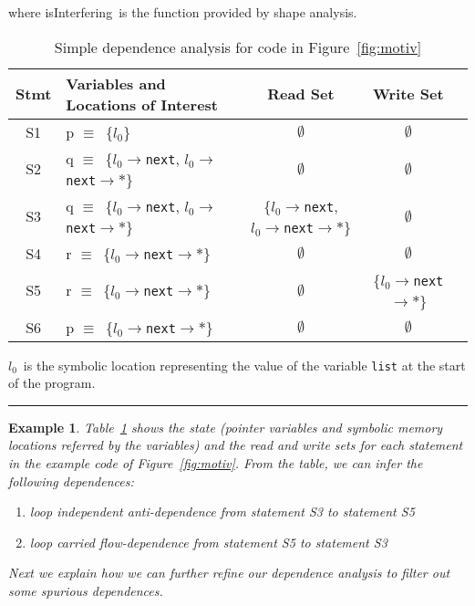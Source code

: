 \documentclass{IOS-Book-Article}
\newtheorem{example}{Example}
\newcommand{\loc}{\ensuremath{l_0}}
\newcommand{\mynext}{\mbox{\tt next}}
\newcommand{\isInterfering}{\mbox{isInterfering}}
\begin{document}
\noindent where \isInterfering\ is the function provided by
shape analysis.

\newcommand{\mapp}{$\equiv$}
\begin{table}
\centering
\begin{tabular}{|c|l|c|c|c|}
\hline 
Stmt & Variables and Locations of Interest & Read Set & Write
Set \\ 
\hline
S1 & p  \mapp\  \{$\loc$\} & $\emptyset$ & $\emptyset$ \\
S2 & q \mapp\   \{$\loc\rightarrow$\mynext, $\loc\rightarrow$\mynext$\rightarrow *$\}& $\emptyset$ & $\emptyset$ \\
S3 & q \mapp\  \{$\loc\rightarrow$\mynext, $\loc\rightarrow$\mynext$\rightarrow *$\} & \{$\loc\rightarrow$\mynext, $\loc\rightarrow$\mynext$\rightarrow *$\} & $\emptyset$ \\
S4 & r \mapp\   \{$\loc\rightarrow$\mynext$\rightarrow *$\} & $\emptyset$ & $\emptyset$ \\
S5 & r \mapp\ \{$\loc\rightarrow$\mynext$\rightarrow *$\} & $\emptyset$ & \{$\loc\rightarrow$\mynext$\rightarrow *$\} \\
S6 & p \mapp\ \{$\loc\rightarrow$\mynext$\rightarrow *$\} & $\emptyset$ & $\emptyset$ \\
\hline
\end{tabular}

\noindent \loc\ is the symbolic location representing the
value of the variable {\tt list} at the start of the program.
\caption{Simple dependence analysis for code in
  Figure~\ref{fig:motiv}} 
\label{fig:table_simple_dep}
\hrule
\end{table}

\begin{example} {\label{ex:dep}\rm
Table~\ref{fig:table_simple_dep} shows the state (pointer
variables and symbolic memory locations referred by the
variables) and the read and write sets for each statement in
the example code of Figure~\ref{fig:motiv}. From the table,
we can infer the following dependences:
\begin{enumerate}
\item loop independent anti-dependence  from statement {S3} to
statement {S5}
\item loop carried flow-dependence  from statement {S5} to
statement {S3}
\end{enumerate}  
Next we explain how we can further refine our dependence
analysis to filter out some spurious dependences.
}
\hfill\psframebox{}  \end{example}
\end{document}
